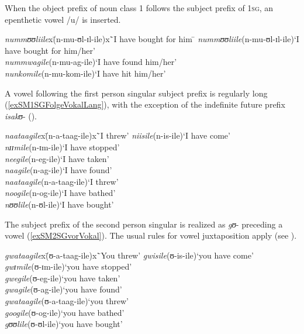 When the object prefix of noun class 1 follows the subject prefix of \textsc{1sg}, an epenthetic vowel /u/ is inserted.
\begin{exe}
	\ex \label{exSM1SGvorOM1}
	\begin{tabbing}
		\textit{nummʊʊliile}x\=(\degree n-mu-ʊl-ɪl-ile)x\=`I have bought for him \=\kill
		\textit{nummʊʊliile}\>(\degree n-mu-ʊl-ɪl-ile)\>`I have bought for him/her'\\
		\textit{nummwagile}\>(\degree n-mu-ag-ile)\>`I have found him/her'\\
		\textit{nunkomile}\>(\degree n-mu-kom-ile)\>`I have hit him/her'
	\end{tabbing}
\end{exe}

A vowel following the first person singular subject prefix is regularly long (\ref{exSM1SGFolgeVokalLang}), with the exception of the indefinite future prefix \textit{isakʊ}- ().
\begin{exe}
	\ex \label{exSM1SGFolgeVokalLang}
	\begin{tabbing}
		\textit{naataagile}x\=(\degree n-a-taag-ile)x\=`I threw'\kill
		\textit{niisile}\>(\degree n-is-ile)\>`I have come'\\
		\textit{nɪɪmile}\>(\degree n-ɪm-ile)\>`I have stopped'\\
		\textit{neegile}\>(\degree n-eg-ile)\>`I have taken'\\
		\textit{naagile}\>(\degree n-ag-ile)\>`I have found'\\
		\textit{naataagile}\>(\degree n-a-taag-ile)\>`I threw'\\
		\textit{noogile}\>(\degree n-og-ile)\>`I have bathed'\\
		\textit{nʊʊlile}\>(\degree n-ʊl-ile)\>`I have bought'
	\end{tabbing}
\end{exe}

The subject prefix of the second person singular is realized as \textit{gʊ}- preceding a vowel (\ref{exSM2SGvorVokal}). The usual rules for vowel juxtaposition apply (see ).
\begin{exe}
	\ex \label{exSM2SGvorVokal}
	\begin{tabbing}
		\kill
		\textit{gwataagile}x\=(\degree ʊ-a-taag-ile)x\=`You threw'\kill
		\textit{gwisile}\>(\degree ʊ-is-ile)\>`you have come'\\
		\textit{gwɪmile}\>(\degree ʊ-ɪm-ile)\>`you have stopped'\\
		\textit{gwegile}\>(\degree ʊ-eg-ile)\>`you have taken'\\
		\textit{gwagile}\>(\degree ʊ-ag-ile)\>`you have found'\\
		\textit{gwataagile}\>(\degree ʊ-a-taag-ile)\>`you threw'\\
		\textit{googile}\>(\degree ʊ-og-ile)\>`you have bathed'\\
		\textit{gʊʊlile}\>(\degree ʊ-ʊl-ile)\>`you have bought'
	\end{tabbing}
\end{exe}

